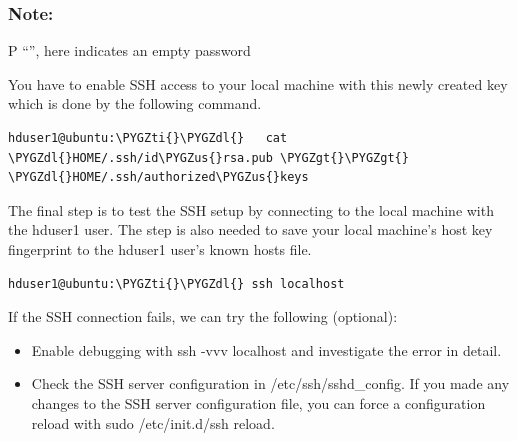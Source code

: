 \documentclass[a4paper,12pt,oneside]{sphinxmanual}
\def\PYGZus{\char`\_}
\def\PYGZgt{\char`\>}
\def\PYGZdl{\char`\$}
\def\PYGZti{\char`\~}
\begin{document}
\subsubsection{Note:}
\label{document:id1}
P “”, here indicates an empty password

You have to enable SSH access to your local machine with this newly created key which is done by the following command.

\begin{Verbatim}[commandchars=\\\{\}]
hduser1@ubuntu:\PYGZti{}\PYGZdl{}   cat \PYGZdl{}HOME/.ssh/id\PYGZus{}rsa.pub \PYGZgt{}\PYGZgt{} \PYGZdl{}HOME/.ssh/authorized\PYGZus{}keys
\end{Verbatim}

The final step is to test the SSH setup by connecting to the local machine with the hduser1 user.
The step is also needed to save your local machine’s host key fingerprint to the hduser1 user’s known hosts file.

\begin{Verbatim}[commandchars=\\\{\}]
hduser1@ubuntu:\PYGZti{}\PYGZdl{} ssh localhost
\end{Verbatim}
\begin{figure}[htbp]
\centering

\end{figure}

If the SSH connection fails, we can try the following (optional):
\begin{itemize}
\item {} 
Enable debugging with ssh -vvv localhost and investigate the error in detail.

\item {} 
Check the SSH server configuration in /etc/ssh/sshd\_config.  If you made any changes to the SSH server configuration file, you can force a configuration reload with sudo /etc/init.d/ssh reload.

\end{itemize}
\end{document}
